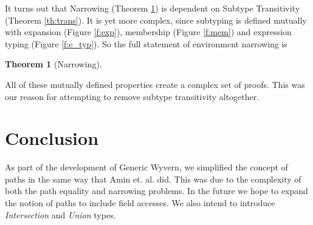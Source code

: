 \documentclass[11pt
              , a4paper
              , twoside
              , openright
              ]{report}
\newtheorem{theorem}{Theorem}
\numberwithin{case}{theorem}
\numberwithin{subcase}{case}
\begin{document}
It turns out that Narrowing (Theorem \ref{th:narrow}) is dependent on Subtype Transitivity (Theorem \ref{th:trans}). It is yet more complex, since subtyping is defined mutually with expansion (Figure \ref{f:exp}), membership (Figure \ref{f:mem}) and expression typing (Figure \ref{f:e_typ}). So the full statement of environment narrowing is 
\begin{theorem}[Narrowing]\label{th:narrow}
\end{theorem}
All of these mutually defined properties create a complex set of proofs. This was our reason for attempting to remove subtype transitivity altogether.





\chapter{Conclusion}\label{ch:conclusion}

As part of the development of Generic Wyvern, we simplified the concept of paths in the same way that Amin et. al. \cite{Amin 2014} did. This was due to the complexity of both the path equality and narrowing problems. In the future we hope to expand the notion of paths to include field accesses. We also intend to introduce \emph{Intersection} and \emph{Union} types. 
\end{document}
